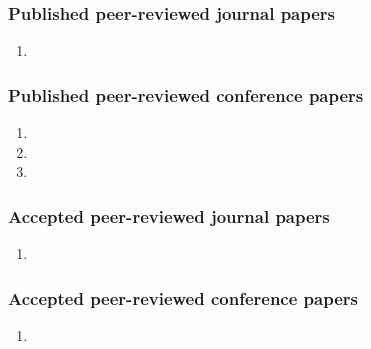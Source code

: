 \subsubsection{Published peer-reviewed journal papers}
\begin{enumerate}
	\item {}
\end{enumerate}

\subsubsection{Published peer-reviewed conference papers}
\begin{enumerate}
	\item {}
	\item {}
	\item {}
\end{enumerate}

\subsubsection{Accepted peer-reviewed journal papers}
\begin{enumerate}
	\item {}
\end{enumerate}

\subsubsection{Accepted peer-reviewed conference papers}
\begin{enumerate}
    \item {}
\end{enumerate}
